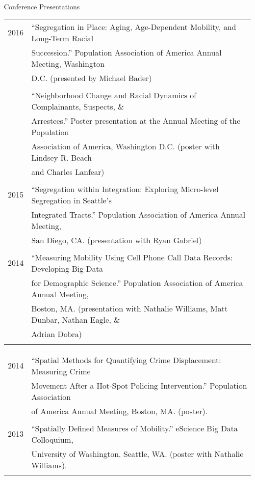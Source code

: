 \documentclass{resume} %
\begin{document}
\begin{rSection}{Conference Presentations}
\begin{tabular}{ @{} >{}l @{\hspace{6ex}} l }
2016	& ``Segregation in Place: Aging, Age-Dependent Mobility, and Long-Term Racial\\
		& Succession.'' Population Association of America Annual Meeting, Washington\\
		& D.C. (presented by Michael Bader)\\\\

		& ``Neighborhood Change and Racial Dynamics of Complainants, Suspects, \&\\
		& Arrestees.'' Poster presentation at the Annual Meeting of the Population\\
		& Association of America, Washington D.C. (poster with Lindsey R. Beach\\
		& and Charles Lanfear)\\\\

2015 	& ``Segregation within Integration: Exploring Micro-level Segregation in Seattle’s\\
		& Integrated Tracts.'' Population Association of America Annual Meeting, \\
		& San Diego, CA. (presentation with Ryan Gabriel)\\\\

2014 	& ``Measuring Mobility Using Cell Phone Call Data Records: Developing Big Data\\
		& for Demographic Science.'' Population Association of America Annual Meeting,\\
		& Boston, MA. (presentation with Nathalie Williams, Matt Dunbar, Nathan Eagle, \&\\
		& Adrian Dobra)\\\\
\end{tabular}

\begin{tabular}{ @{} >{}l @{\hspace{6ex}} l }
2014	& ``Spatial Methods for Quantifying Crime Displacement: Measuring Crime\\
		& Movement After a Hot-Spot Policing Intervention.'' Population Association\\
		& of America Annual Meeting, Boston, MA. (poster).\\\\

2013 	& ``Spatially Defined Measures of Mobility.'' eScience Big Data Colloquium,\\
		& University of Washington, Seattle, WA. (poster with Nathalie Williams).\\\\


\end{tabular}
\end{rSection}
\end{document}
